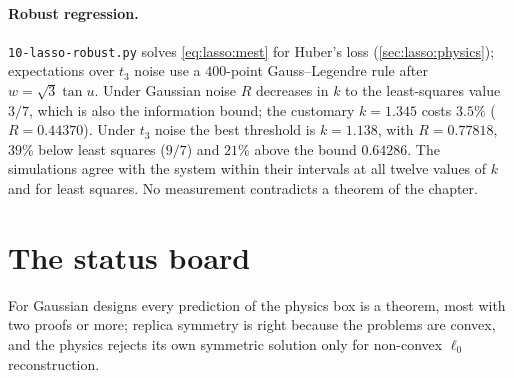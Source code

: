 \begin{refsection}
\paragraph{Robust regression.} \texttt{10-lasso-robust.py} solves \eqref{eq:lasso:mest} for Huber's loss (\cref{sec:lasso:physics}); expectations over $t_3$ noise use a $400$-point Gauss--Legendre rule after $w=\sqrt3\tan u$. Under Gaussian noise $R$ decreases in $k$ to the least-squares value $3/7$, which is also the information bound; the customary $k=1.345$ costs $3.5\%$ ($R=0.44370$). Under $t_3$ noise the best threshold is $k=1.138$, with $R=0.77818$, $39\%$ below least squares ($9/7$) and $21\%$ above the bound $0.64286$. The simulations agree with the system within their intervals at all twelve values of $k$ and for least squares. No measurement contradicts a theorem of the chapter.

\section{The status board}\label{sec:lasso:status}

For Gaussian designs every prediction of the physics box is a theorem, most with two proofs or more; replica symmetry is right because the problems are convex, and the physics rejects its own symmetric solution only for non-convex $\ell_0$ reconstruction.


\end{refsection}
